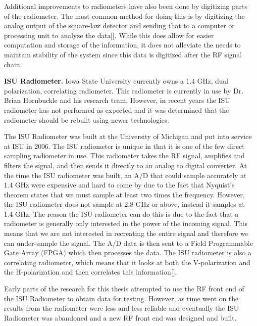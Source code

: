 Additional improvements to radiometers have also been done by digitizing parts of the radiometer.  The most common method for doing this is by digitizing the analog output of the square-law detector and sending that to a computer or processing unit to analyze the data[\cite{Bremer}].  While this does allow for easier computation and storage of the information, it does not alleviate the needs to maintain stability of the system since this data is digitized after the RF signal chain.

\textbf{ISU Radiometer.}  Iowa State University currently owns a 1.4 GHz, dual polarization, correlating radiometer.  This radiometer is currently in use by Dr. Brian Hornbuckle and his research team.  However, in recent years the ISU radiometer has not performed as expected and it was determined that the radiometer should be rebuilt using newer technologies.  

The ISU Radiometer was built at the University of Michigan and put into service at ISU in 2006.  The ISU radiometer is unique in that it is one of the few direct sampling radiometer in use\cite{Erbas}.  This radiometer takes the RF signal, amplifies and filters the signal, and then sends it directly to an analog to digital converter.  At the time the ISU radiometer was built, an A/D that could sample accurately at 1.4 GHz were expensive and hard to come by due to the fact that Nyquist's theorem states that we must sample at least two times the frequency.  However, the ISU radiometer does not sample at 2.8 GHz or above, instead it samples at 1.4 GHz.  The reason the ISU radiometer can do this is due to the fact that a radiometer is generally only interested in the power of the incoming signal.  This means that we are not interested in recreating the entire signal and therefore we can under-sample the signal.  The A/D data is then sent to a Field Programmable Gate Array (FPGA) which then processes the data.  The ISU radiometer is also a correlating radiometer, which means that it looks at both the V-polarization and the H-polarization and then correlates this information[\cite{Fischman2001}]. 

Early parts of the research for this thesis attempted to use the RF front end of the ISU Radiometer to obtain data for testing.  However, as time went on the results from the radiometer were less and less reliable and eventually the ISU Radiometer was abandoned and a new RF front end was designed and built.  

